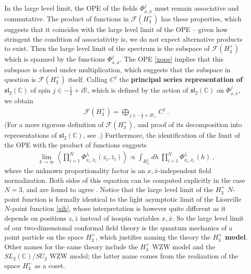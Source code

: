 \documentclass[12pt, a4paper, notitlepage, twoside]{report}
\numberwithin{equation}{section}
\theoremstyle{break}
\begin{document}
In the large level limit, the OPE of the fields $\Phi^j_{x,\bar{x}}$ must remain associative and commutative. 
The product of functions in $\mathcal{F}(H_3^+)$ has these properties, which suggests that it coincides with the large level limit of the OPE -- given how stringent the condition of associativity is, we do not expect alternative products to exist. 
Then the large level limit of the spectrum is the subspace of 
$\mathcal{F}(H_3^+)$ which is spanned by the functions $\Phi^j_{x,\bar{x}}$.
The OPE \eqref{xope} implies that this subspace is closed under multiplication, which suggests that the subspace in question is $\mathcal{F}(H_3^+)$ itself. 
Calling $C^j$ the \textbf{\boldmath principal series representation of $\mathfrak{sl}_2({\mathbb{C}})$} of spin $j\in -\frac12 +i{\mathbb{R}}$, which is defined by the action of $\mathfrak{sl}_2({\mathbb{C}})$ on $\Phi^j_{x,\bar{x}}$, we obtain
\begin{align}
 \mathcal{F}(H_3^+) = \bigoplus_{j\in -\frac12+i{\mathbb{R}}_+} C^j\ .
\end{align}
(For a more rigorous definition of $\mathcal{F}(H_3^+)$, and proof of its decomposition into representations of $\mathfrak{sl}_2({\mathbb{C}})$, see \cite{tes97b}.)
Furthermore, the identification of the limit of the OPE with the product of functions suggests
\begin{align}
 \underset{k\to \infty}{\lim} \left\langle \prod_{i=1}^N \Phi^{j_i}_{x_i,\bar{x}_i}(z_i,\bar{z}_i)\right\rangle \propto \int_{H_3^+} dh\ \prod_{i=1}^N \Phi^{j_i}_{x_i,\bar{x}_i}(h)\ , 
\end{align}
where the unknown proportionality factor is an $x,\bar{x}$-independent field normalization.
Both sides of this equation can be computed explicitly in the case $N=3$, and are found to agree \cite{tes97b}.
Notice that the large level limit of the $H_3^+$ $N$-point function is formally identical to the light asymptotic limit of the Liouville $N$-point function \eqref{zih}, whose interpretation is however quite different as it depends on positions $z,\bar{z}$ instead of isospin variables $x,\bar{x}$.
So the large level limit of our two-dimensional conformal field theory is the quantum mechanics of a point particle on the space $H_3^+$, which justifies naming the theory the \textbf{\boldmath $H_3^+$ model}.
Other names for the same theory include the $H_3^+$ WZW model and the $SL_2({\mathbb{C}})/SU_2$ WZW model; the latter name comes from the realization of the space $H_3^+$ as a coset.
\end{document}
